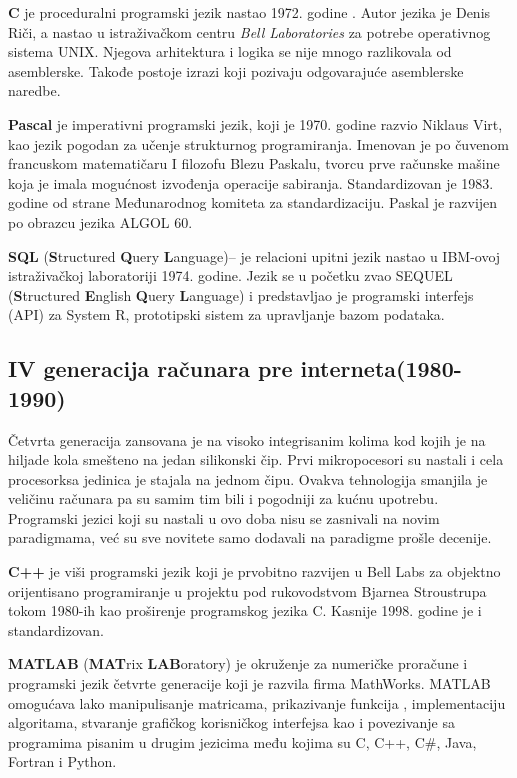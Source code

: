 \documentclass[a4paper]{article}
\begin{document}
\textbf{C} je proceduralni programski jezik nastao 1972. godine . Autor jezika je Denis Riči, a nastao u istraživačkom centru \emph{ Bell Laboratories} za potrebe operativnog sistema UNIX. Njegova arhitektura i logika se nije mnogo razlikovala od asemblerske. Takođe postoje izrazi koji pozivaju odgovarajuće asemblerske naredbe.

\textbf{Pascal} je imperativni programski jezik, koji je 1970. godine razvio Niklaus Virt, kao jezik pogodan za učenje strukturnog programiranja. Imenovan je po čuvenom francuskom matematičaru I filozofu Blezu Paskalu, tvorcu prve računske mašine koja je imala mogućnost izvođenja operacije sabiranja. Standardizovan je 1983. godine od strane Međunarodnog komiteta za standardizaciju. Paskal je razvijen po obrazcu jezika ALGOL 60.

\textbf{SQL} (\textbf{S}tructured \textbf{Q}uery \textbf{L}anguage)– je relacioni upitni jezik nastao u IBM-ovoj istraživačkoj laboratoriji 1974. godine. Jezik se u početku zvao SEQUEL (\textbf{S}tructured \textbf{E}nglish \textbf{Q}uery \textbf{L}anguage) i predstavljao je programski interfejs (API) za System R, prototipski sistem za upravljanje bazom podataka.

\subsection{IV generacija računara pre interneta(1980-1990)}
Četvrta generacija zansovana je na visoko integrisanim kolima kod kojih je na hiljade kola smešteno na jedan silikonski čip. Prvi mikropocesori su nastali i cela procesorksa jedinica je stajala na jednom čipu. Ovakva tehnologija smanjila je veličinu računara pa su samim tim bili i pogodniji za kućnu upotrebu.
Programski jezici koji su nastali u ovo doba nisu se zasnivali na novim paradigmama, već su sve novitete samo dodavali na paradigme prošle decenije.

\textbf{C++} je viši programski jezik koji je prvobitno razvijen u Bell Labs za objektno orijentisano programiranje u projektu pod rukovodstvom Bjarnea Stroustrupa tokom 1980-ih kao proširenje programskog jezika C. Kasnije 1998. godine je i standardizovan.

\textbf{MATLAB} (\textbf{MAT}rix \textbf{LAB}oratory) je okruženje za numeričke proračune i programski jezik četvrte generacije koji je razvila firma MathWorks. MATLAB omogućava lako manipulisanje matricama, prikazivanje funkcija , implementaciju algoritama, stvaranje grafičkog korisničkog interfejsa kao i povezivanje sa programima pisanim u drugim jezicima među kojima su C, C++, C\#, Java, Fortran i Python.
\end{document}
